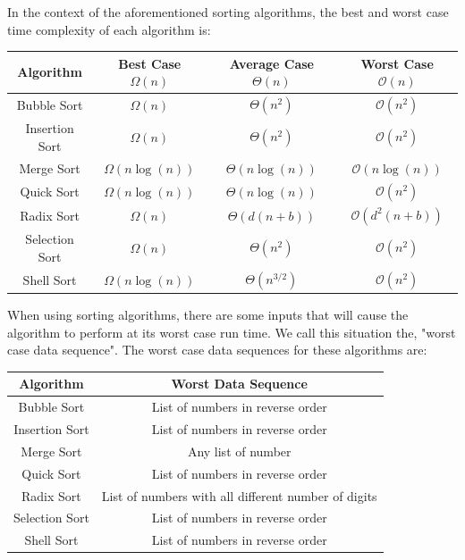 \documentclass[a4paper,9pt]{article}
\begin{document}
\noindent In the context of the aforementioned sorting algorithms, the best and worst case time complexity of each algorithm is:

\begin{table}[ht]
    \centering
    \begin{tabular}{|c|c|c|c|}
        \hline \textbf{Algorithm} & \textbf{Best Case $\Omega(n)$} & \textbf{Average Case $\Theta(n)$} & \textbf{Worst Case $\mathcal{O}(n)$} \\ \hline
        Bubble Sort & $\Omega(n)$ & $\Theta(n^2)$ & $\mathcal{O}(n^2)$ \\ \hline
        Insertion Sort & $\Omega(n)$ & $\Theta(n^2)$ & $\mathcal{O}(n^2)$ \\ \hline
        Merge Sort & $\Omega(n\log{(n)})$ & $\Theta(n\log{(n)})$ & $\mathcal{O}(n\log{(n)})$ \\ \hline
        Quick Sort & $\Omega(n\log{(n)})$ & $\Theta(n\log{(n)})$ & $\mathcal{O}(n^2)$ \\ \hline
        Radix Sort & $\Omega(n)$ & $\Theta(d(n+b))$ & $\mathcal{O}(d^2(n+b))$ \\ \hline
        Selection Sort & $\Omega(n)$ & $\Theta(n^2)$ & $\mathcal{O}(n^2)$ \\ \hline
        Shell Sort & $\Omega(n\log{(n)})$ & $\Theta(n^{3/2})$ & $\mathcal{O}(n^2)$ \\ \hline
    \end{tabular}
\end{table}

\noindent When using sorting algorithms, there are some inputs that will cause the algorithm to perform at its worst case run time. We call this situation the, "worst case data sequence". The worst case data sequences for these algorithms are:

\begin{table}[ht]
    \centering
    \begin{tabular}{|c|c|}
        \hline \textbf{Algorithm} & \textbf{Worst Data Sequence} \\ \hline
        Bubble Sort & List of numbers in reverse order \\ \hline
        Insertion Sort & List of numbers in reverse order \\ \hline
        Merge Sort & Any list of number \\ \hline
        Quick Sort & List of numbers in reverse order \\ \hline
        Radix Sort & List of numbers with all different number of digits \\ \hline
        Selection Sort & List of numbers in reverse order \\ \hline
        Shell Sort & List of numbers in reverse order \\ \hline
    \end{tabular}
\end{table}
\end{document}
